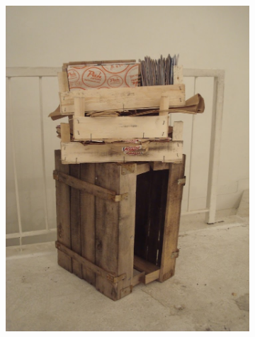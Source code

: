 \begin{figure}
    \centering
    \begin{subfigure}[b]{0.47\textwidth}
        \includegraphics[width=\textwidth]{project_graphics/torun2.jpg}
    \end{subfigure}
    \begin{subfigure}[b]{0.47\textwidth}

\end{subfigure}
\end{figure}

